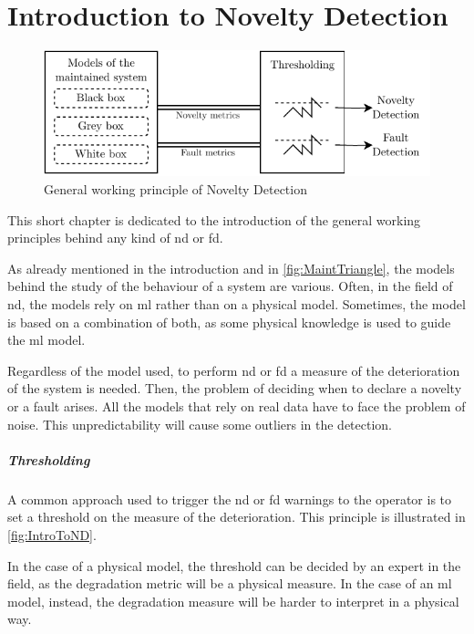 \chapter{Introduction to Novelty Detection}
\label{ch:GeneralND}

\begin{figure}
    \centering
    \includegraphics[width=\textwidth]{images/Intro/GeneralND.pdf}
    \caption{General working principle of Novelty Detection}
    \label{fig:IntroToND}
\end{figure}

This short chapter is dedicated to the introduction of the general working principles behind any kind of \gls{nd} or \gls{fd}. 

As already mentioned in the introduction and in \autoref{fig:MaintTriangle}, the models behind the study of the behaviour of a system are various. Often, in the field of \gls{nd}, the models rely on \gls{ml} rather than on a physical model. Sometimes, the model is based on a combination of both, as some physical knowledge is used to guide the \gls{ml} model.

Regardless of the model used, to perform \gls{nd} or \gls{fd} a measure of the deterioration of the system is needed. Then, the problem of deciding when to declare a novelty or a fault arises. All the models that rely on real data have to face the problem of noise. This unpredictability will cause some outliers in the detection. 

\paragraph{Thresholding}
\label{sec:Thresholding}

A common approach used to trigger the \gls{nd} or \gls{fd} warnings to the operator is to set a threshold on the measure of the deterioration. This principle is illustrated in \autoref{fig:IntroToND}. 

In the case of a physical model, the threshold can be decided by an expert in the field, as the degradation metric will be a physical measure. In the case of an \gls{ml} model, instead, the degradation measure will be harder to interpret in a physical way. 


